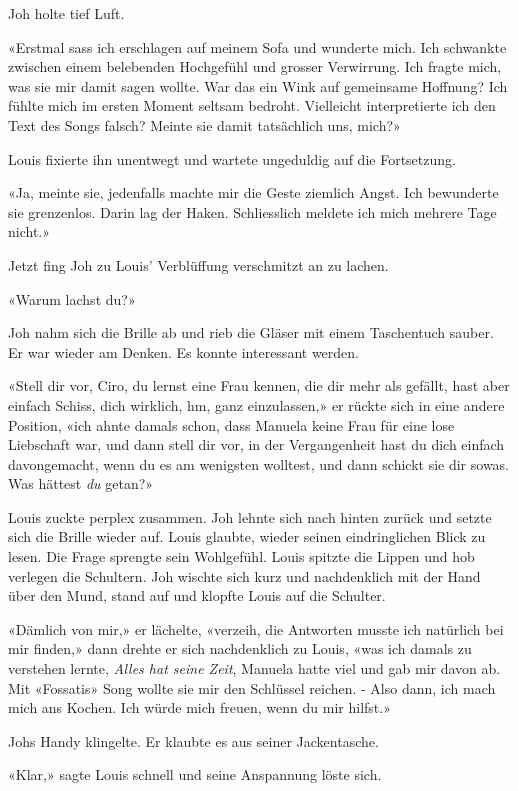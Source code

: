Joh holte tief Luft.

«Erstmal sass ich erschlagen auf meinem Sofa und wunderte mich. Ich
schwankte zwischen einem belebenden Hochgefühl und grosser Verwirrung.
Ich fragte mich, was sie mir damit sagen wollte. War das ein Wink auf
gemeinsame Hoffnung? Ich fühlte mich im ersten Moment seltsam bedroht.
Vielleicht interpretierte ich den Text des Songs falsch? Meinte sie 
damit tatsächlich uns, mich?»

Louis fixierte ihn unentwegt und wartete ungeduldig auf die
Fortsetzung.

«Ja, meinte sie, jedenfalls machte mir die Geste ziemlich Angst. Ich
bewunderte sie grenzenlos. Darin lag der Haken. Schliesslich meldete ich
mich mehrere Tage nicht.»

Jetzt fing Joh zu Louis’ Verblüffung verschmitzt an zu lachen.

«Warum lachst du?»

Joh nahm sich die Brille ab und rieb die Gläser mit einem Taschentuch sauber. Er war wieder am Denken. Es konnte
interessant werden.

«Stell dir vor, Ciro, du lernst eine Frau kennen, die dir mehr als
gefällt, hast aber einfach Schiss, dich wirklich, hm, ganz einzulassen,»
er rückte sich in eine andere Position, «ich ahnte damals schon,
dass Manuela keine Frau für eine lose Liebschaft war, und dann stell dir
vor, in der Vergangenheit hast du dich einfach davongemacht, wenn du es
am wenigsten wolltest, und dann schickt sie dir sowas. Was hättest
\emph{du} getan?»

Louis zuckte perplex zusammen. Joh lehnte sich nach hinten zurück und
setzte sich die Brille wieder auf. Louis glaubte, wieder seinen
eindringlichen Blick zu lesen. 
Die Frage sprengte sein Wohlgefühl. Louis spitzte die Lippen und hob verlegen die
Schultern. Joh wischte sich kurz und nachdenklich mit der Hand über den Mund, stand
auf und klopfte Louis auf die Schulter.

«Dämlich von mir,» er lächelte, «verzeih, die Antworten musste ich
natürlich bei mir finden,» dann drehte er sich nachdenklich zu Louis,
«was ich damals zu verstehen lernte, \emph{Alles hat seine Zeit},
Manuela hatte viel und gab mir davon ab. Mit «Fossatis» Song
wollte sie mir den Schlüssel reichen. - Also dann, ich mach mich ans
Kochen. Ich würde mich freuen, wenn du mir hilfst.»

Johs Handy klingelte. Er klaubte es aus seiner Jackentasche.

«Klar,» sagte Louis schnell und seine Anspannung löste sich.

